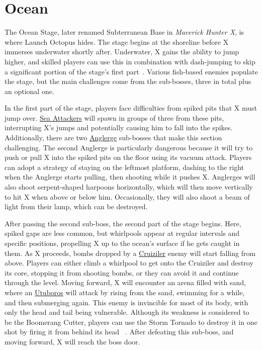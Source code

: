 \section{Ocean}

The Ocean Stage, later renamed Subterranean Base in \textit{Maverick Hunter X}, is where Launch Octopus hides. The stage begins at the shoreline before X immerses underwater shortly after. Underwater, X gains the ability to jump higher, and skilled players can use this in combination with dash-jumping to skip a significant portion of the stage's first part~\cite{stratwiki:Ocean}. Various fish-based enemies populate the stage, but the main challenges come from the sub-bosses, three in total plus an optional one.

In the first part of the stage, players face difficulties from spiked pits that X must jump over. \hyperlink{enem:Sea_Attacker}{Sea Attackers} will spawn in groups of three from these pits, interrupting X's jumps and potentially causing him to fall into the spikes. Additionally, there are two \hyperlink{miniboss:Anglerge}{Anglerge} sub-bosses that make this section challenging. The second Anglerge is particularly dangerous because it will try to push or pull X into the spiked pits on the floor using its vacuum attack. Players can adopt a strategy of staying on the leftmost platform, dashing to the right when the Anglerge starts pulling, then shooting while it pushes X. Anglerges will also shoot serpent-shaped harpoons horizontally, which will then move vertically to hit X when above or below him. Occasionally, they will also shoot a beam of light from their lamp, which can be destroyed.

After passing the second sub-boss, the second part of the stage begins. Here, spiked gaps are less common, but whirlpools appear at regular intervals and specific positions, propelling X up to the ocean's surface if he gets caught in them. As X proceeds, bombs dropped by a \hyperlink{miniboss:Cruiziler}{Cruiziler} enemy will start falling from above. Players can either climb a whirlpool to get onto the Cruiziler and destroy its core, stopping it from shooting bombs, or they can avoid it and continue through the level. Moving forward, X will encounter an arena filled with sand, where an \hyperlink{miniboss:Utuboros}{Utuboros} will attack by rising from the sand, swimming for a while, and then submerging again. This enemy is invincible for most of its body, with only the head and tail being vulnerable. Although its weakness is considered to be the Boomerang Cutter, players can use the Storm Tornado to destroy it in one shot by firing it from behind its head ~\cite{wiki:Utuboros}. After defeating this sub-boss, and moving forward, X will reach the boss door.

